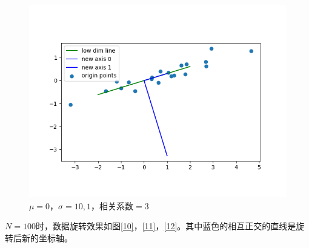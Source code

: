 \begin{figure}[htbp]
\begin{minipage}[t]{0.3\linewidth}
        \includegraphics[width=\textwidth]{figures/Figure_9.png}
        \caption{$\mu=0$，$\sigma=10,1$，相关系数$=3$}
        \label{9}
    \end{minipage}
\end{figure}

$N=100$时，数据旋转效果如图\ref{10}，\ref{11}，\ref{12}。其中蓝色的相互正交的直线是旋转后新的坐标轴。

